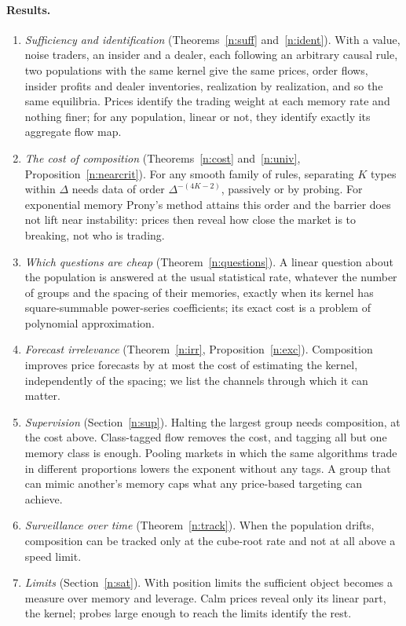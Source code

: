 \paragraph{Results.}
\begin{enumerate}[label=(\arabic*),leftmargin=*,itemsep=2pt]
\item \emph{Sufficiency and identification} (Theorems~\ref{n:suff} and~\ref{n:ident}). With a value, noise traders, an insider and a dealer, each following an arbitrary causal rule, two populations with the same kernel give the same prices, order flows, insider profits and dealer inventories, realization by realization, and so the same equilibria. Prices identify the trading weight at each memory rate and nothing finer; for any population, linear or not, they identify exactly its aggregate flow map.
\item \emph{The cost of composition} (Theorems~\ref{n:cost} and~\ref{n:univ}, Proposition~\ref{n:nearcrit}). For any smooth family of rules, separating $K$ types within $\Delta$ needs data of order $\Delta^{-(4K-2)}$, passively or by probing. For exponential memory Prony's method attains this order and the barrier does not lift near instability: prices then reveal how close the market is to breaking, not who is trading.
\item \emph{Which questions are cheap} (Theorem~\ref{n:questions}). A linear question about the population is answered at the usual statistical rate, whatever the number of groups and the spacing of their memories, exactly when its kernel has square-summable power-series coefficients; its exact cost is a problem of polynomial approximation.
\item \emph{Forecast irrelevance} (Theorem~\ref{n:irr}, Proposition~\ref{n:exc}). Composition improves price forecasts by at most the cost of estimating the kernel, independently of the spacing; we list the channels through which it can matter.
\item \emph{Supervision} (Section~\ref{n:sup}). Halting the largest group needs composition, at the cost above. Class-tagged flow removes the cost, and tagging all but one memory class is enough. Pooling markets in which the same algorithms trade in different proportions lowers the exponent without any tags. A group that can mimic another's memory caps what any price-based targeting can achieve.
\item \emph{Surveillance over time} (Theorem~\ref{n:track}). When the population drifts, composition can be tracked only at the cube-root rate and not at all above a speed limit.
\item \emph{Limits} (Section~\ref{n:sat}). With position limits the sufficient object becomes a measure over memory and leverage. Calm prices reveal only its linear part, the kernel; probes large enough to reach the limits identify the rest.
\end{enumerate}

